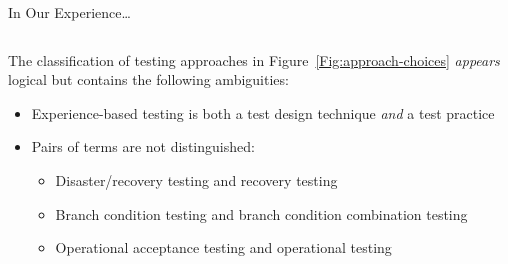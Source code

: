 \documentclass[22pt]{beamer}
\begin{document}
\begin{frame}[fragile]
\begin{textblock}{7.25}
\begin{block}{\fontsize{37}{20}\selectfont In Our Experience\dots}
\begin{columns}
\begin{column}{0.25\textwidth}
                    The classification of testing approaches in
                    Figure~\ref{Fig:approach-choices} \emph{appears} logical
                    but contains the following ambiguities:
                    \begin{itemize}
                        \item Experience-based testing is both a test design
                              technique \emph{and} a test practice
                        \item Pairs of terms are not distinguished:
                              \begin{itemize}
                                  \item Disaster/recovery testing and recovery
                                        testing
                                  \item Branch condition testing and branch
                                        condition combination testing
                                  \item Operational acceptance testing and
                                        operational testing \cite[p.~303]{IEEE2017}
                              \end{itemize}
                    \end{itemize}
                \end{column}
            \end{columns}
            \vspace{5mm}
        \end{block}
    \end{textblock}


\end{frame}
\end{document}
